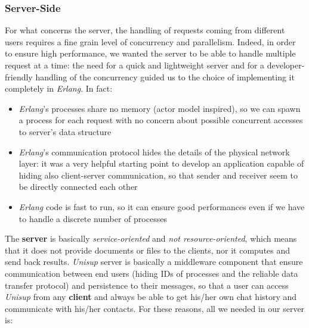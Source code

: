 \subsubsection{Server-Side}
For what concerns the server, the handling of requests coming from different users requires a fine grain level of concurrency and parallelism. Indeed, in order to ensure high performance, we wanted the server to be able to handle multiple request at a time: the need for a quick and lightweight server and for a developer-friendly handling of the concurrency guided us to the choice of implementing it completely in \textit{Erlang}. In fact:

\begin{itemize}
	\item \textit{Erlang}’s processes share no memory (actor model inspired), so we can spawn a process for each request with no concern about possible concurrent accesses to server’s data structure
	\item \textit{Erlang}’s communication protocol hides the details of the physical network layer: it was a very helpful starting point to develop an application capable of hiding also client-server communication, so that sender and receiver seem to be directly connected each other
	\item \textit{Erlang} code is fast to run, so it can ensure good performances even if we have to handle a discrete number of processes
\end{itemize}
The \textbf{server} is basically \textit{service-oriented} and \textit{not resource-oriented}, which means that it does not provide documents or files to the clients, nor it computes and send back results. \textit{Unisup} server is basically a middleware component that ensure communication between end users (hiding IDs of processes and the reliable data transfer protocol) and persistence to their messages, so that a user can access \textit{Unisup} from any \textbf{client} and always be able to get his/her own chat history and communicate with his/her contacts.
For these reasons, all we needed in our server is:

